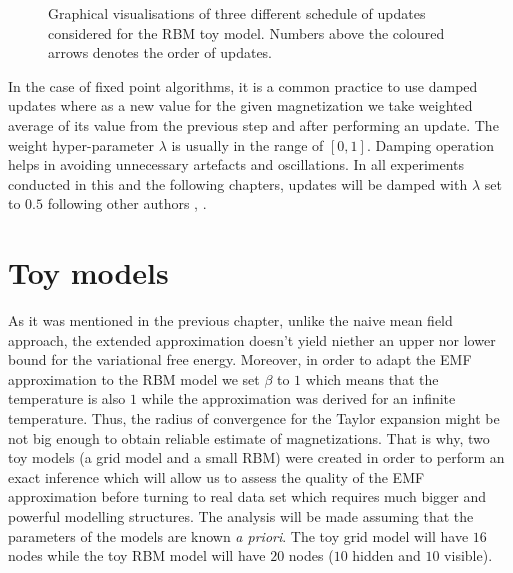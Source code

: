 \begin{figure}[!htb]
\begin{center}
\end{center}
\endminipage\hfill
 \caption[Graphical illustration of three different kinds of updates]{Graphical visualisations of three different schedule of updates considered for the RBM toy model. Numbers above the coloured arrows denotes the order of updates.}
\label{fig:updates}
\end{figure}
\newpage

In the case of fixed point algorithms, it is a common practice to use damped updates \cite{murphy2012machine} where as a new value for the given magnetization we take weighted average of its value from the previous step and after performing an update. The weight hyper-parameter $\lambda$ is usually in the range of $[0,1]$. Damping operation helps in avoiding unnecessary artefacts and oscillations. In all experiments conducted in this and the following chapters, updates will be damped with $\lambda$ set to $0.5$ following other authors \cite{gabrie2015training}, \cite{welling2002new}.

\section{Toy models}
As it was mentioned in the previous chapter, unlike the naive mean field approach, the extended approximation doesn't yield niether an upper nor lower bound for the variational free energy. Moreover, in order to adapt the EMF approximation to the RBM model we set $\beta$ to $1$ which means that the temperature is also $1$ while the approximation was derived for an infinite temperature. Thus, the radius of convergence for the Taylor expansion might be not big enough to obtain reliable estimate of magnetizations. That is why, two toy models (a grid model and a small RBM) were created in order to perform an exact inference which will allow us to assess the quality of the EMF approximation before turning to real data set which requires much bigger and powerful modelling structures. The analysis will be made assuming that the parameters of the models are known \emph{a priori}. The toy grid model will have $16$ nodes while the toy RBM model will have $20$ nodes ($10$ hidden and $10$ visible).

